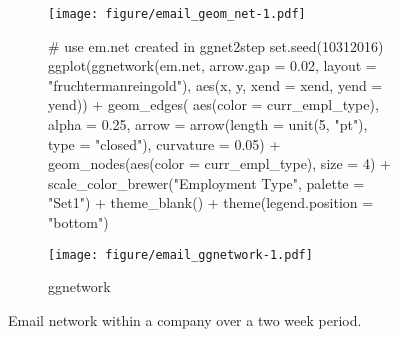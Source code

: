 \begin{figure}[hbt]
\begin{subfigure}[t]{\textwidth}
\begin{adjustbox}{valign=t}
\begin{minipage}{.49\textwidth}
                   \end{minipage}

                  \begin{minipage}{.49\textwidth}

\texttt{[image: figure/email\_geom\_net-1.pdf]}

                          \end{minipage}

                          \end{adjustbox}
\end{subfigure}

\begin{subfigure}[t]{\textwidth}
\caption{ggnetwork}


             \begin{adjustbox}{valign=t}

             \begin{minipage}{.49\textwidth}
{\footnotesize
\begin{example}
# use em.net created in ggnet2step
set.seed(10312016)
ggplot(ggnetwork(em.net, arrow.gap = 0.02,
              layout = "fruchtermanreingold"),
       aes(x, y, xend = xend, yend = yend)) +
  geom_edges(
    aes(color = curr_empl_type),
    alpha = 0.25,
    arrow = arrow(length = unit(5, "pt"),
                  type = "closed"),
    curvature = 0.05) +
  geom_nodes(aes(color = curr_empl_type),
             size = 4) +
  scale_color_brewer("Employment Type",
                     palette = "Set1") +
  theme_blank() +
  theme(legend.position = "bottom")
\end{example} 
}

                   \end{minipage}

                  \begin{minipage}{.49\textwidth}

\texttt{[image: figure/email\_ggnetwork-1.pdf]}

                          \end{minipage}

                          \end{adjustbox}
\end{subfigure}

\caption{\label{fig.cap:email} Email network within a company over a two week period.}
\end{figure}
\afterpage{\clearpage}

